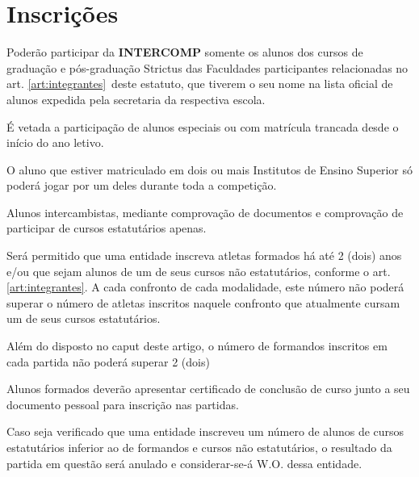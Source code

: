 
{\let\clearpage\relax \chapter{Inscrições}}

\begin{article}
	Poderão participar da \textbf{INTERCOMP} somente os alunos dos cursos de graduação e pós-graduação Strictus das Faculdades participantes relacionadas no art. \ref{art:integrantes}\ulo\ deste estatuto, que tiverem o seu nome na lista oficial de alunos expedida pela secretaria da respectiva escola.

	\begin{xparagraph}
		É vetada a participação de alunos especiais ou com matrícula trancada desde o início do ano letivo.
	\end{xparagraph}

	\begin{xparagraph}
		O aluno que estiver matriculado em dois ou mais Institutos de Ensino Superior só poderá jogar por um deles durante toda a competição.
	\end{xparagraph}

	\begin{xparagraph}
		Alunos intercambistas, mediante comprovação de documentos e comprovação de participar de cursos estatutários apenas.
	\end{xparagraph}
\end{article}

\begin{article}
	Será permitido que uma entidade inscreva atletas formados há até 2 (dois) anos e/ou que sejam alunos de um de seus cursos não estatutários, conforme o art. \ref{art:integrantes}\ulo. A cada confronto de cada modalidade, este número não poderá superar o número de atletas inscritos naquele confronto que atualmente cursam um de seus cursos estatutários.

	\begin{xparagraph}
		Além do disposto no caput deste artigo, o número de formandos inscritos em cada partida não poderá superar 2 (dois)
	\end{xparagraph}

	\begin{xparagraph}
		Alunos formados deverão apresentar certificado de conclusão de curso junto a seu documento pessoal para inscrição nas partidas.
	\end{xparagraph}

	\begin{xparagraph}
		Caso seja verificado que uma entidade inscreveu um número de alunos de cursos estatutários inferior ao de formandos e cursos não estatutários, o resultado da partida em questão será anulado e considerar-se-á W.O. dessa entidade.
	\end{xparagraph}
\end{article}

